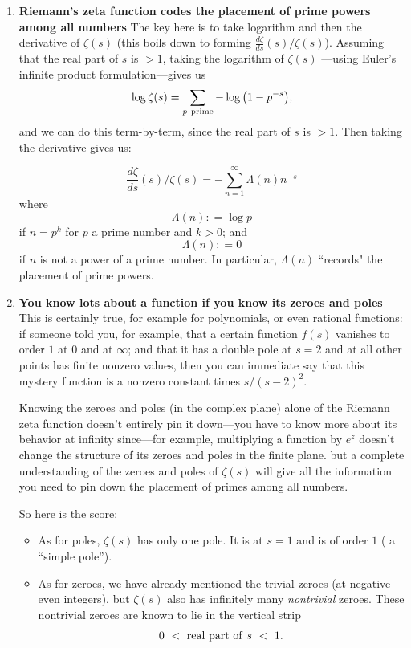 \documentclass[openany]{book}
\theoremstyle{plain}
\theoremstyle{definition}
\newcommand{\todo}[1]{\par\vspace{1em}{\small---------\\{{\bf To be done:} #1}\\-----------}\par\vspace{1em}}
\begin{document}
  \begin{enumerate}\item {\bf Riemann's zeta function codes the
      placement of prime powers among all numbers} The key here is to
    take logarithm and then the derivative of $\zeta(s)$ (this boils
    down to forming ${\frac{d{\zeta}}{ds}}(s)/\zeta(s)$). Assuming
    that the real part of $s$ is $>1$, taking the logarithm of
    $\zeta(s)$ ---using Euler's infinite product formulation---gives
    us $$\log\zeta(s)= \sum_{p \ {\rm
        prime}}-\log{\big(1-p^{-s}\big)},$$ and we can do this
    term-by-term, since the real part of $s$ is $>1$.  Then taking the
    derivative gives us:

  \vskip20pt
   $${\frac{d{\zeta}}{ds}}(s)/\zeta(s)= -\sum_{n=1}^{\infty}\Lambda(n)n^{-s}$$ where  $$\Lambda(n): = \log p$$ if $n= p^k$ for $p$ a prime number and $k >0$;  and  $$\Lambda(n): = 0$$ if $n$ is not a power of a prime number.  In particular,  $\Lambda(n)$ ``records" the placement of prime powers.


 \vskip20pt

\item {\bf You know lots about a function if you know its zeroes and
    poles} This is certainly true, for example for polynomials, or
  even rational functions: if someone told you, for example, that a
  certain function $f(s)$ vanishes to order $1$ at $0$ and at
  $\infty$; and that it has a double pole at $s=2$ and at all other
  points has finite nonzero values, then you can immediate say that
  this mystery function is a nonzero constant times $s/(s-2)^2$.

  Knowing the zeroes and poles (in the complex plane) alone of the
  Riemann zeta function doesn't entirely pin it down---you have to
  know more about its behavior at infinity since---for example,
  multiplying a function by $e^z$ doesn't change the structure of its
  zeroes and poles in the finite plane.  but a complete understanding
  of the zeroes and poles of $\zeta(s)$ will give all the information
  you need to pin down the placement of primes among all numbers.

  So here is the score:

  \begin{itemize} \item As for poles, $\zeta(s)$ has only one pole. It
    is at $s=1$ and is of order $1$ ( a ``simple pole'').\item As for
    zeroes, we have already mentioned the trivial zeroes (at negative
    even integers), but $\zeta(s)$ also has infinitely many {\it
      nontrivial} zeroes. These nontrivial zeroes are known to lie in
    the vertical strip $$0\ < \ {\rm real\ part\ of\ } s\ < \
    1.$$\end{itemize}

 \end{enumerate}
\end{document}
